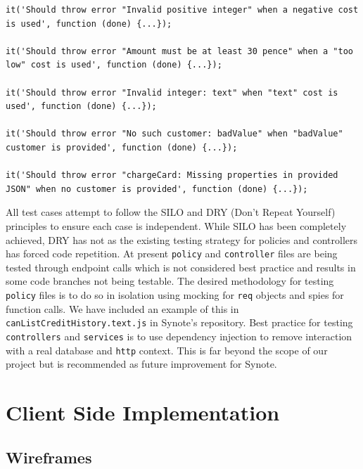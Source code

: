 \begin{listing}[H]
\begin{verbatim}
it('Should throw error "Invalid positive integer" when a negative cost is used', function (done) {...});

it('Should throw error "Amount must be at least 30 pence" when a "too low" cost is used', function (done) {...});

it('Should throw error "Invalid integer: text" when "text" cost is used', function (done) {...});

it('Should throw error "No such customer: badValue" when "badValue" customer is provided', function (done) {...});

it('Should throw error "chargeCard: Missing properties in provided JSON" when no customer is provided', function (done) {...});

\end{verbatim}
\label{lst:stripe-test-cases}
\end{listing}

All test cases attempt to follow the SILO and DRY (Don't Repeat Yourself) principles to ensure each case is independent. While SILO has been completely achieved, DRY has not as the existing testing strategy for policies and controllers has forced code repetition. At present \texttt{policy} and \texttt{controller} files are being tested through endpoint calls which is not considered best practice and results in some code branches not being testable. The desired methodology for testing \texttt{policy} files is to do so in isolation using mocking for \texttt{req} objects and spies for function calls. We have included an example of this in \texttt{canListCreditHistory.text.js} in Synote's repository. Best practice for testing \texttt{controllers} and \texttt{services} is to use dependency injection to remove interaction with a real database and \texttt{http} context. This is far beyond the scope of our project but is recommended as future improvement for Synote.

\section{Client Side Implementation}
\label{sec:client-side-implementation}

\subsection{Wireframes}
\label{subsec:wireframes}


